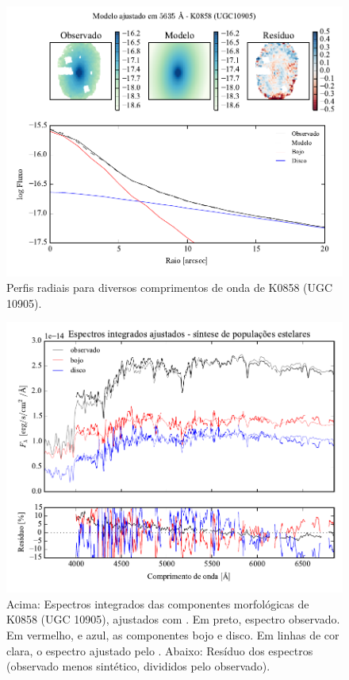 \begin{figure}
	\includegraphics[page=5]{figuras-decomp/K0858_sample006a}
	\caption[Perfis radiais para diversos comprimentos de onda de K0858 (UGC 10905)]
	{Perfis radiais para diversos comprimentos de onda de K0858 (UGC 10905).}
	\label{fig:decompRadprofSpec:K0858}
\end{figure}

\begin{figure}
	\includegraphics[page=15,width=\textwidth]{figuras/sample006a_synthesis}
	\caption[Espectros ajustados com \starlight das componentes morfológicas de
	K0858 (UGC 10905)]
	{Acima: Espectros integrados das componentes morfológicas de
	K0858 (UGC 10905), ajustados com \starlight. Em preto, espectro observado. Em
	vermelho, e azul, as componentes bojo e disco. Em linhas de cor clara, o
	espectro ajustado pelo \starlight. Abaixo: Resíduo dos espectros (observado
	menos sintético, divididos pelo observado).}
	\label{fig:decompSintese:K0858}
\end{figure}

